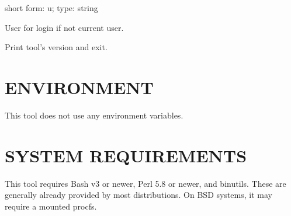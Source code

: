\documentclass[letterpaper,10pt,english]{sphinxmanual}
\begin{document}

\begin{fulllineitems}
\label{\detokenize{mariadb-database-summary:cmdoption-mariadb-database-summary-user}}
short form: \sphinxhyphen{}u; type: string

User for login if not current user.

\end{fulllineitems}


\begin{fulllineitems}
\label{\detokenize{mariadb-database-summary:cmdoption-mariadb-database-summary-version}}
Print tool’s version and exit.

\end{fulllineitems}



\section{ENVIRONMENT}
\label{\detokenize{mariadb-database-summary:environment}}
This tool does not use any environment variables.


\section{SYSTEM REQUIREMENTS}
\label{\detokenize{mariadb-database-summary:system-requirements}}
This tool requires Bash v3 or newer, Perl 5.8 or newer, and binutils.
These are generally already provided by most distributions.
On BSD systems, it may require a mounted procfs.
\end{document}
